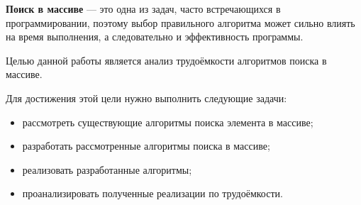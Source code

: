 
\textbf{Поиск в массиве} --- это одна из задач, часто встречающихся в программировании, поэтому выбор правильного алгоритма может сильно влиять на время выполнения, а следовательно и эффективность программы.

Целью данной работы является анализ трудоёмкости алгоритмов поиска в массиве.

Для достижения этой цели нужно выполнить следующие задачи:
\begin{itemize}
  \item рассмотреть существующие алгоритмы поиска элемента в массиве;
  \item разработать рассмотренные алгоритмы поиска в массиве;
  \item реализовать разработанные алгоритмы;
  \item проанализировать полученные реализации по трудоёмкости.
\end{itemize}

\clearpage